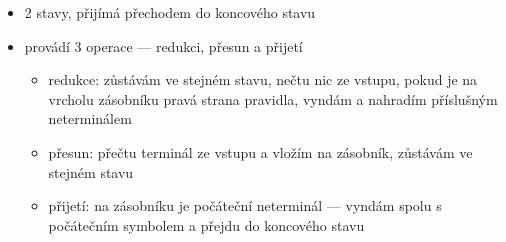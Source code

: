 \begin{itemize}
	\begin{itemize}
		\item 2 stavy, přijímá přechodem do koncového stavu
		\item provádí 3 operace --- redukci, přesun a přijetí
		\begin{itemize}
			\item redukce: zůstávám ve stejném stavu, nečtu nic ze vstupu, pokud je na vrcholu zásobníku pravá strana pravidla, vyndám a nahradím příslušným neterminálem
			\item přesun: přečtu terminál ze vstupu a vložím na zásobník, zůstávám ve stejném stavu
			\item přijetí: na zásobníku je počáteční neterminál --- vyndám spolu s počátečním symbolem a přejdu do koncového stavu
		\end{itemize}
	\end{itemize}
\end{itemize}